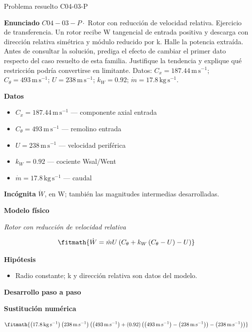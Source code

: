 \documentclass[10pt,openany]{book}
\begin{document}
\begin{studiumworked}{Problema resuelto C04-03-P}


\noindent\textbf{Enunciado}
\(C04-03-P \cdot\) Rotor con reducción de velocidad relativa. Ejercicio de transferencia. Un rotor recibe W tangencial de entrada positiva y descarga con dirección relativa simétrica y módulo reducido por k. Halle la potencia extraída. Antes de consultar la solución, prediga el efecto de cambiar el primer dato respecto del caso resuelto de esta familia. Justifique la tendencia y explique qué restricción podría convertirse en limitante. Datos: \(C_x=187.44\, \mathrm{m}\,\mathrm{s}^{-1}\); \(C_\theta=493\, \mathrm{m}\,\mathrm{s}^{-1}\); \(U=238\, \mathrm{m}\,\mathrm{s}^{-1}\); \(k_W=0.92\); \(\dot m=17.8\, \mathrm{kg}\,\mathrm{s}^{-1}\).

\noindent\textbf{Datos}
\begin{itemize}
\item $C_x = 187.44\,\mathrm{m}\,\mathrm{s}^{-1}$ — componente axial entrada
\item $C_\theta = 493\,\mathrm{m}\,\mathrm{s}^{-1}$ — remolino entrada
\item $U = 238\,\mathrm{m}\,\mathrm{s}^{-1}$ — velocidad periférica
\item $k_W = 0.92$ — cociente Wsal/Went
\item $\dot m = 17.8\,\mathrm{kg}\,\mathrm{s}^{-1}$ — caudal
\end{itemize}

\noindent\textbf{Incógnita}
$\dot{W}$, en $\mathrm{W}$; también las magnitudes intermedias desarrolladas.

\noindent\textbf{Modelo físico}

\noindent\textit{Rotor con reducción de velocidad relativa}

\[
\fitmath{\dot{W}=\dot m U \left(C_\theta + k_W \left(C_\theta - U\right) - U\right)}
\]

\noindent\textbf{Hipótesis}
\begin{itemize}
\item Radio constante; k y dirección relativa son datos del modelo.
\end{itemize}

\noindent\textbf{Desarrollo paso a paso}



\noindent\textbf{Sustitución numérica}

\[
\fitmath{\left(17.8\,\mathrm{kg}\,\mathrm{s}^{-1}\right) \left(238\,\mathrm{m}\,\mathrm{s}^{-1}\right) \left(\left(493\,\mathrm{m}\,\mathrm{s}^{-1}\right) + \left(0.92\right) \left(\left(493\,\mathrm{m}\,\mathrm{s}^{-1}\right) - \left(238\,\mathrm{m}\,\mathrm{s}^{-1}\right)\right) - \left(238\,\mathrm{m}\,\mathrm{s}^{-1}\right)\right)}
\]


\end{studiumworked}
\end{document}
